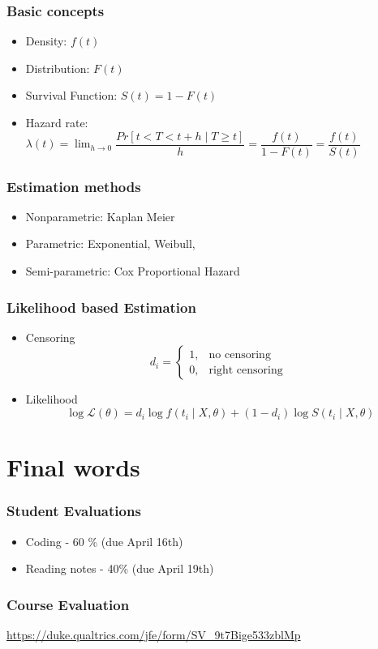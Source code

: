 \documentclass{beamer}
\newcommand{\Lik}{\mathcal{L}}
\newcommand{\1}{\mathbb{1}}
\begin{document}
\begin{frame}\frametitle{Basic concepts}
\begin{itemize}
\item Density: $f(t)$
\item Distribution: $F(t)$ 
\item Survival Function: $S(t)=1-F(t)$
\item Hazard rate: $\lambda(t) = \lim_{h \rightarrow 0} \dfrac{Pr[t<T<t+h \mid T\geq t]}{h} = \dfrac{f(t)}{1-F(t)} = \dfrac{f(t)}{S(t)}$
\end{itemize}
\end{frame}

\begin{frame}\frametitle{Estimation methods}
\begin{itemize}
\item Nonparametric: Kaplan Meier
\item Parametric: Exponential, Weibull,
\item Semi-parametric: Cox Proportional Hazard
\end{itemize}
\end{frame}

\begin{frame}\frametitle{Likelihood based Estimation}
\begin{itemize}
\item Censoring
\begin{equation}
d_i = \begin{cases} 1, & \mbox{no censoring} \\ 0, & \mbox{right censoring } \end{cases}
\end{equation}
\item Likelihood
\begin{equation}
\log \Lik(\theta) = d_i \log f(t_i \mid X,\theta) + (1-d_i) \log S(t_i \mid X,\theta)
\end{equation}
\end{itemize}
\end{frame}

\section{Final words}

\begin{frame}
\tableofcontents[currentsection] 
\end{frame}


\begin{frame}\frametitle{Student Evaluations}
\begin{itemize}
\item Coding - 60 \% (due April 16th)
\item Reading notes - 40\% (due April 19th)
\end{itemize}
\end{frame}


\begin{frame}\frametitle{Course Evaluation}
\url{https://duke.qualtrics.com/jfe/form/SV_9t7Bige533zblMp}
\end{frame}
\end{document}
